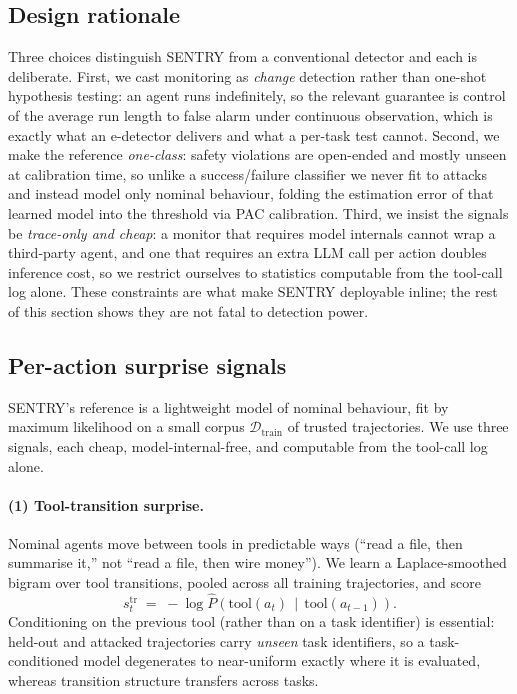 \documentclass[10pt,journal,compsoc]{IEEEtran}
\theoremstyle{plain}
\theoremstyle{definition}
\newcommand{\Dcal}{\mathcal{D}}
\begin{document}
\subsection{Design rationale}\label{sec:rationale}

Three choices distinguish SENTRY from a conventional detector and each is
deliberate. First, we cast monitoring as \emph{change} detection rather than
one-shot hypothesis testing: an agent runs indefinitely, so the relevant
guarantee is control of the average run length to false alarm under continuous
observation, which is exactly what an e-detector delivers and what a per-task
test cannot. Second, we make the reference \emph{one-class}: safety violations
are open-ended and mostly unseen at calibration time, so unlike a
success/failure classifier we never fit to attacks and instead model only
nominal behaviour, folding the estimation error of that learned model into the
threshold via PAC calibration. Third, we insist the signals be
\emph{trace-only and cheap}: a monitor that requires model internals cannot
wrap a third-party agent, and one that requires an extra LLM call per action
doubles inference cost, so we restrict ourselves to statistics computable from
the tool-call log alone. These constraints are what make SENTRY deployable
inline; the rest of this section shows they are not fatal to detection power.

\subsection{Per-action surprise signals}\label{sec:signals}

SENTRY's reference is a lightweight model of nominal behaviour, fit by maximum
likelihood on a small corpus \(\Dcal_{\mathrm{train}}\) of trusted
trajectories. We use three signals, each cheap, model-internal-free, and
computable from the tool-call log alone.

\paragraph{(1) Tool-transition surprise.} Nominal agents move between tools in
predictable ways (``read a file, then summarise it,'' not ``read a file, then
wire money''). We learn a Laplace-smoothed bigram over tool transitions,
pooled across all training trajectories, and score
\begin{equation}
s^{\mathrm{tr}}_t \;=\; -\log \hat{P}\!\left(\mathrm{tool}(a_t)\,\middle|\,
   \mathrm{tool}(a_{t-1})\right).
\label{eq:transition}
\end{equation}
Conditioning on the previous tool (rather than on a task identifier)
is essential: held-out and attacked trajectories carry \emph{unseen} task
identifiers, so a task-conditioned model degenerates to near-uniform exactly
where it is evaluated, whereas transition structure transfers across tasks.
\end{document}
